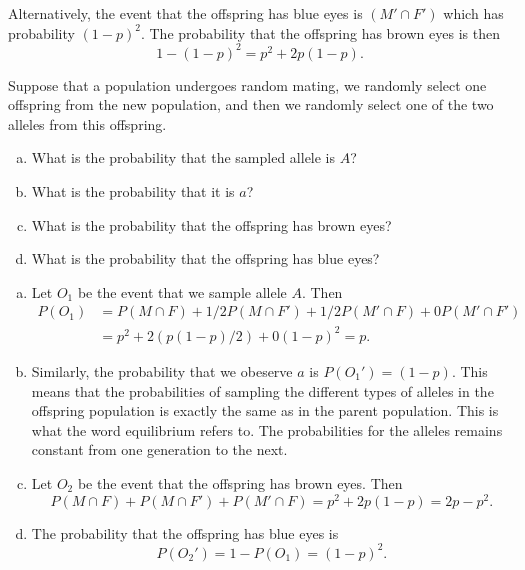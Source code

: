 \documentclass[addpoints,answers]{exam}
\begin{document}
\begin{questions}
\begin{solution}
\begin{enumerate}[a)]
       Alternatively, the event that the offspring has blue eyes is $(M' \cap F')$ which has probability $(1-p)^2$. The probability that the offspring has brown eyes is then
       \[
         1-(1-p)^2=p^2 + 2p(1-p).
       \]
    \end{enumerate}
    \end{solution}
    
    \question
     Suppose that a population undergoes random mating, we randomly select one offspring from the new population, and then we randomly select one of the two alleles from this offspring.

  \medskip
  
  \begin{enumerate}[a)]
  \item What is the probability that the sampled allele is $A$? 
  \item What is the probability that it is $a$?
  \item What is the probability that the offspring has brown eyes?
  \item What is the probability that the offspring has blue eyes?
  \end{enumerate}

    \begin{solution}
    \begin{enumerate}[a)]
    \item Let $O_1$ be the event that we sample allele $A$. Then
      \[
      \begin{aligned}
        P(O_1)&=P(M \cap F) + 1/2 P(M \cap F') + 1/2 P(M' \cap F) + 0 P(M' \cap F')\\
        &=p^2 + 2(p(1-p)/2) + 0 (1-p)^2 = p.
        \end{aligned}
      \]
      \item Similarly, the probability that we obeserve $a$ is $P(O_1')=(1-p)$. This means that the probabilities of sampling the different types of alleles in the offspring population is exactly the same as in the parent population. This is what the word equilibrium refers to. The probabilities for the alleles remains constant from one generation to the next. 
      \item Let $O_2$ be the event that the offspring has brown eyes. Then
      $$
      P(M \cap F) + P(M \cap F') + P(M' \cap F)=p^2 + 2p(1-p)=2p-p^2.
      $$
      \item The probability that the offspring has blue eyes is
      $$
      P(O_2')=1-P(O_1)=(1-p)^2.
      $$
      \end{enumerate}
    \end{solution}
    

\end{questions}
\end{document}
